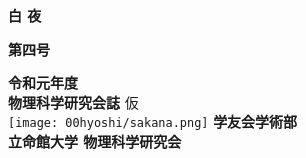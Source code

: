 \documentclass[10pt,b5paper,papersize,dvipdfmx]{jsbook}
\begin{document}
\thispagestyle{empty}

\begin{center}
  {\fontsize{90}{0}\selectfont \bfseries 白 夜}
%
  \begin{flushright}
    \vspace{-6zw}
    {\fontsize{18}{0}\selectfont \bfseries 第四号\hspace{.5zw}\vspace{-1zw}}
    \vspace{6zw}
  \end{flushright}
%
  \vspace{-1zw}
  {\fontsize{13}{0}\selectfont \bfseries 令和元年度 \\ 物理科学研究会誌}
%
  \vfill
  仮\\ \texttt{[image: 00hyoshi/sakana.png]}
  \vfill
  {\fontsize{13}{0}\selectfont \bfseries 学友会学術部}\\
  \vspace{0.2zw}
  {\fontsize{13}{0}\selectfont \bfseries 立命館大学 物理科学研究会}
\end{center}
\end{document}
